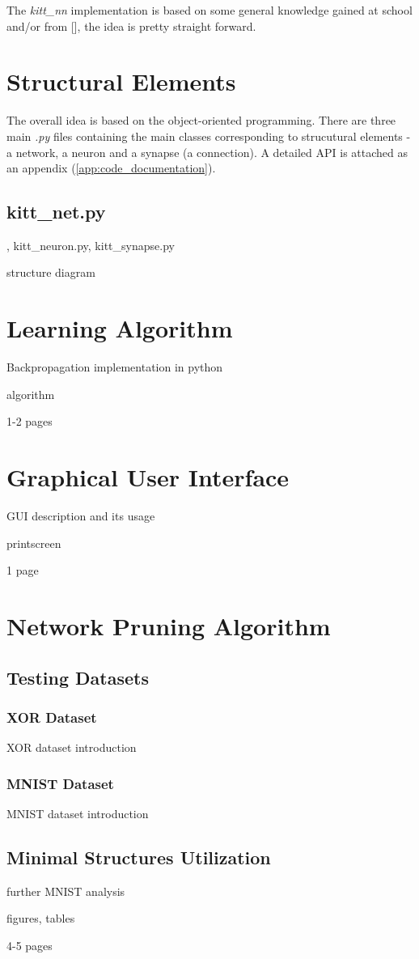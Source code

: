 The \textit{kitt\_nn} implementation is based on some general knowledge gained at school and/or from [], the idea is pretty straight forward.

\section{Structural Elements}
The overall idea is based on the object-oriented programming. There are three main \textit{.py} files containing the main classes corresponding to strucutural elements - a network, a neuron and a synapse (a connection). A detailed API is attached as an appendix (\ref{app:code_documentation}).

\subsection*{kitt\_net.py}

, kitt\_neuron.py, kitt\_synapse.py

structure diagram



\section{Learning Algorithm} \label{sec:learning_algorithm}
Backpropagation implementation in python

algorithm

1-2 pages

\section{Graphical User Interface}
GUI description and its usage

printscreen

1 page

\section{Network Pruning Algorithm} \label{sec:network_pruning_algorithm}

\subsection{Testing Datasets}

\subsubsection*{XOR Dataset}
XOR dataset introduction

\subsubsection*{MNIST Dataset}
MNIST dataset introduction

\subsection{Minimal Structures Utilization}
further MNIST analysis

figures, tables

4-5 pages